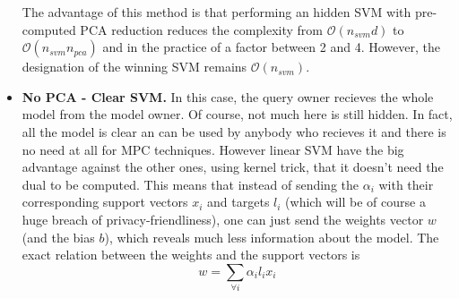 \begin{itemize}
    The advantage of this method is that performing an hidden SVM with pre-computed PCA reduction reduces the complexity from $\mathcal{O}(n_{svm}d)$ to $\mathcal{O}(n_{svm}n_{pca})$ and in the practice of a factor between 2 and 4. However, the designation of the winning SVM remains $\mathcal{O}(n_{svm})$.
    
    \item \textbf{No PCA - Clear SVM.} In this case, the query owner recieves the whole model from the model owner. Of course, not much here is still hidden. In fact, all the model is clear an can be used by anybody who recieves it and there is no need at all for MPC techniques. However linear SVM have the big advantage against the other ones, using kernel trick, that it doesn't need the dual to be computed. This means that instead of sending the $\alpha_i$ with their corresponding support vectors $x_i$ and targets $l_i$ (which will be of course a huge breach of privacy-friendliness), one can just send the weights vector $w$ (and the bias $b$), which reveals much less information about the model. The exact relation between the weights and the support vectors is 
    \begin{equation}
        w = \sum_{\forall i}\alpha_i l_i x_i
    \end{equation}

\end{itemize}
